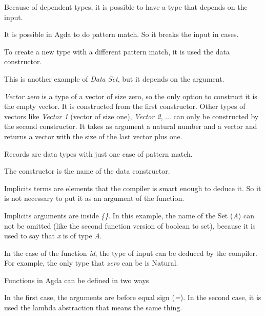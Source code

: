   Because of dependent types, it is possible to have a type that depends on the input.


  It is possible in Agda to do pattern match.
  So it breaks the input in cases.


  To create a new type with a different pattern match, it is used the data constructor.


  This is another example of \emph{Data Set}, but it depends on the argument.


  \emph{Vector zero} is a type of a vector of size zero, so the only option to construct it is the empty vector.
  It is constructed from the first constructor.
  Other types of vectors like \emph{Vector 1} (vector of size one), \emph{Vector 2}, ... can only be constructed by
  the second constructor.
  It takes as argument a natural number and a vector and returns a vector with the size of the last vector
  plus one.

  Records are data types with just one case of pattern match.


  The constructor is the name of the data constructor.

  Implicits terms are elements that the compiler is smart enough to deduce it.
  So it is not necessary to put it as an argument of the function.


  Implicits arguments are inside \emph{\{\}}.
  In this example, the name of the Set (\emph{A}) can not be omitted
  (like the second function version of boolean to set),
  because it is used to say that \emph{x} is of type \emph{A}.

  In the case of the function \emph{id}, the type of input can be deduced by the compiler.
  For example, the only type that \emph{zero} can be is Natural.


  Functions in Agda can be defined in two ways


  In the first case, the arguments are before equal sign (\emph{=}).
  In the second case, it is used the lambda abstraction that means the same thing.

